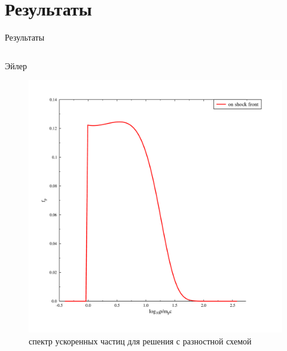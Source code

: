 \documentclass[8pt,pdf,hyperref={unicode},serif]{beamer}
\begin{document}
\section{Результаты}
\begin{frame}{Результаты}
\begin{columns}
\begin{column}{0.5\textwidth}
Эйлер
\begin{figure}[H]
\centering
\includegraphics[width=0.90\linewidth]{r_common}
\caption{спектр ускоренных частиц для решения с разностной схемой}
\end{figure}
\end{column}


\end{columns}
\end{frame}
\end{document}
